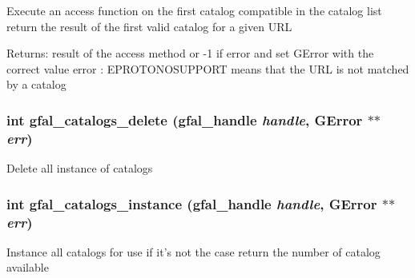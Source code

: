Execute an access function on the first catalog compatible in the catalog list return the result of the first valid catalog for a given URL \begin{Desc}
\item[Returns:]result of the access method or -1 if error and set GError with the correct value error : EPROTONOSUPPORT means that the URL is not matched by a catalog \end{Desc}
\subsubsection{\setlength{\rightskip}{0pt plus 5cm}int gfal\_\-catalogs\_\-delete (gfal\_\-handle {\em handle}, GError $\ast$$\ast$ {\em err})}\label{gfal__common__catalog_8h_405974336e7b4ebaafeea02577d7d4d5}


Delete all instance of catalogs 
\subsubsection{\setlength{\rightskip}{0pt plus 5cm}int gfal\_\-catalogs\_\-instance (gfal\_\-handle {\em handle}, GError $\ast$$\ast$ {\em err})}\label{gfal__common__catalog_8h_d272f75eb549a72064524ecce3c25fe7}


Instance all catalogs for use if it's not the case return the number of catalog available 